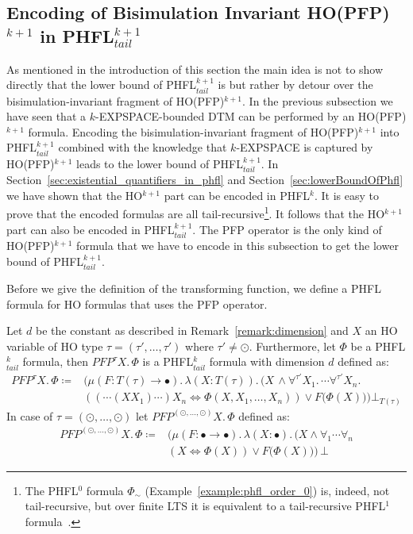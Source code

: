\subsection{Encoding of Bisimulation Invariant HO(PFP)$^{k+1}$ in PHFL$^{k+1}_{tail}$}\label{subsec:bisimulationInvariantHopfptoPhfl}

As mentioned in the introduction of this section the main idea is not to show directly that the 
lower bound of PHFL$^{k+1}_{tail}$ is  but rather by detour over the 
bisimulation-invariant fragment of HO(PFP)$^{k+1}$. In the previous subsection we have seen 
 that a $k$-EXPSPACE-bounded DTM can be performed by an HO(PFP)$^{k+1}$
formula. Encoding the bisimulation-invariant fragment of HO(PFP)$^{k+1}$ into
PHFL$^{k+1}_{tail}$ combined with the knowledge that $k$-EXPSPACE is captured by 
HO(PFP)$^{k+1}$ leads to the lower bound of PHFL$^{k+1}_{tail}$. In
Section~\ref{sec:existential_quantifiers_in_phfl} and Section~\ref{sec:lowerBoundOfPhfl} we 
have shown that the HO$^{k+1}$ part can be encoded in PHFL$^k$. It is easy to prove that the 
encoded formulas are all tail-recursive\footnote{The PHFL$^0$ formula $\Phi_\sim$ (Example~\ref{example:phfl_order_0}) is, indeed, not tail-recursive, but over finite LTS it is equivalent to a tail-recursive PHFL$^1$ formula~\cite{lange2014capturing_long}.}. It follows that the HO$^{k+1}$ part can also be 
encoded in  PHFL$^{k+1}_{tail}$. The PFP operator is the only kind of HO(PFP)$^{k+1}$ formula 
that we have to encode in this subsection to get the lower bound of PHFL$^{k+1}_{tail}$.

Before we give the definition of the transforming function, we define a PHFL formula for HO formulas that uses the PFP operator.

\begin{definition}
Let $d$ be the constant as described in Remark~\ref{remark:dimension} and $X$ an HO variable of HO type $\tau = (\tau', \dots, \tau')$ where $\tau' \neq \odot$. Furthermore, let
    $\Phi$ be a PHFL$^k_{tail}$
    formula, then $PFP^\tau X.\,\Phi$
    is a PHFL$^k_{tail}$ formula with dimension $d$ defined as:
    \begin{align*}
     PFP^\tau X. \, \Phi \coloneqq &\Big(\mu (F \colon T(\tau) \rightarrow \bullet).\,\lambda (X \colon T(\tau)).\, \big(X\,\wedge \forall^{\tau'}X_1.\, \dotsb \forall^{\tau'}X_n.\, \\&( (\dotsb (X X_1) \dotsb) X_n \Leftrightarrow \Phi(X, X_1, \dots, X_n) ) \vee F(\Phi(X)\big)\Big)\bot_{T(\tau)}
\end{align*}    
    In case of $\tau = (\odot, \dots, \odot)$ let $PFP^{(\odot, \dots, \odot)} X.\,\Phi$ defined as:
    \begin{align*}
    PFP^{(\odot, \dots, \odot)} X.\,\Phi \coloneqq & \Big(\mu (F \colon \bullet \rightarrow \bullet).\,\lambda (X \colon \bullet).\, \big(X \wedge \forall_1 \dotsb \forall_n \\&(X \Leftrightarrow \Phi(X)) \vee F(\Phi(X)\big)\Big)\,\bot 
    \end{align*}
\end{definition}

